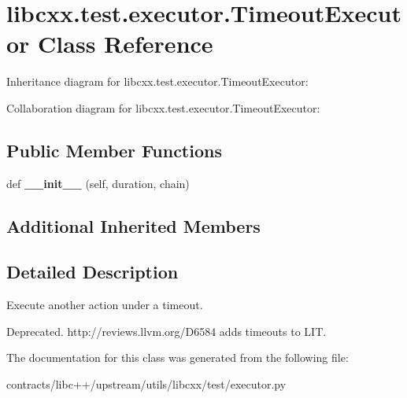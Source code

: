 \hypertarget{classlibcxx_1_1test_1_1executor_1_1_timeout_executor}{}\section{libcxx.\+test.\+executor.\+Timeout\+Executor Class Reference}
\label{classlibcxx_1_1test_1_1executor_1_1_timeout_executor}


Inheritance diagram for libcxx.\+test.\+executor.\+Timeout\+Executor\+:


Collaboration diagram for libcxx.\+test.\+executor.\+Timeout\+Executor\+:
\subsection*{Public Member Functions}
\begin{DoxyCompactItemize}
\item 
\mbox{\label{classlibcxx_1_1test_1_1executor_1_1_timeout_executor_ab1194c0ebc5f44726d48bca32934beb3}} 
def {\bfseries \+\_\+\+\_\+init\+\_\+\+\_\+} (self, duration, chain)
\end{DoxyCompactItemize}
\subsection*{Additional Inherited Members}


\subsection{Detailed Description}
\begin{DoxyVerb}Execute another action under a timeout.

Deprecated. http://reviews.llvm.org/D6584 adds timeouts to LIT.
\end{DoxyVerb}
 

The documentation for this class was generated from the following file\+:\begin{DoxyCompactItemize}
\item 
contracts/libc++/upstream/utils/libcxx/test/executor.\+py\end{DoxyCompactItemize}
